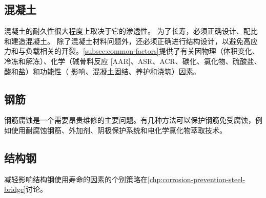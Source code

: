 \subsection{混凝土}
混凝土的耐久性很大程度上取决于它的渗透性。 为了长寿，必须正确设计、配比和建造混凝土。 除了混凝土材料问题外，还必须正确进行结构设计，以避免高应力和与负载相关的开裂。\cref{subsec:common-factors}提供了有关因物理（体积变化、冷冻和解冻）、化学（碱骨料反应 [AAR]、ASR、ACR、碳化、氯化物、硫酸盐、酸和盐）和功能性（ 影响、混凝土固结、养护和浇筑）因素。

\subsection{钢筋}
钢筋腐蚀是一个需要昂贵维修的主要问题。有几种方法可以保护钢筋免受腐蚀，例如使用耐腐蚀钢筋、外加剂、阴极保护系统和电化学氯化物萃取技术。

\subsection{结构钢}
减轻影响结构钢使用寿命的因素的个别策略在\cref{chp:corrosion-prevention-steel-bridge}讨论。

